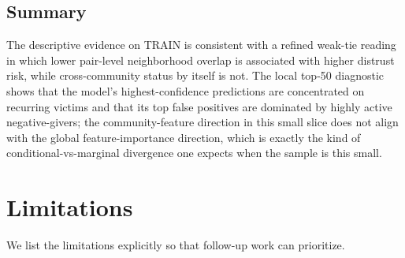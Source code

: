 \documentclass[conference]{IEEEtran}
\begin{document}
\subsection{Summary}

The descriptive evidence on TRAIN is consistent with a refined
weak-tie reading in which lower pair-level neighborhood overlap is
associated with higher distrust risk, while cross-community status by
itself is not. The local top-50 diagnostic shows that the model's
highest-confidence predictions are concentrated on recurring victims
and that its top false positives are dominated by highly active
negative-givers; the community-feature direction in this small slice
does not align with the global feature-importance direction, which is
exactly the kind of conditional-vs-marginal divergence one expects
when the sample is this small.

\section{Limitations}\label{sec:lim}

We list the limitations explicitly so that follow-up work can
prioritize.
\end{document}

